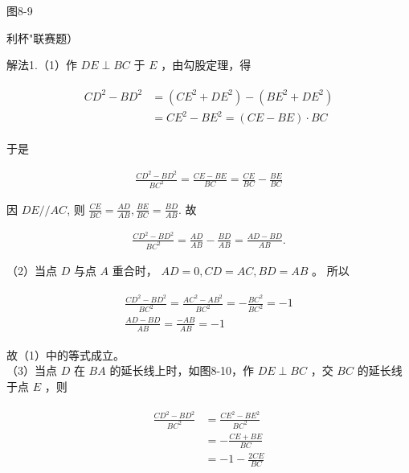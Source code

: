 \documentclass[10pt]{article}
\begin{document}
图8-9

利杯"联赛题）

解法1.（1）作 $D E \perp B C$ 于 $E$ ，由勾股定理，得

\begin{align*}
\begin{aligned}
C D^{2}-B D^{2} & =\left(C E^{2}+D E^{2}\right)-\left(B E^{2}+D E^{2}\right) \\
& =C E^{2}-B E^{2}=(C E-B E) \cdot B C
\end{aligned}
\end{align*}

于是

\begin{align*}
\frac{C D^{2}-B D^{2}}{B C^{2}}=\frac{C E-B E}{B C}=\frac{C E}{B C}-\frac{B E}{B C}
\end{align*}

因 $D E / / A C$, 则 $\frac{C E}{B C}=\frac{A D}{A B}, \frac{B E}{B C}=\frac{B D}{A B}$. 故

\begin{align*}
\frac{C D^{2}-B D^{2}}{B C^{2}}=\frac{A D}{A B}-\frac{B D}{A B}=\frac{A D-B D}{A B} .
\end{align*}

（2）当点 $D$ 与点 $A$ 重合时， $A D=0, C D=A C, B D=A B$ 。 所以

\begin{align*}
\begin{gathered}
\frac{C D^{2}-B D^{2}}{B C^{2}}=\frac{A C^{2}-A B^{2}}{B C^{2}}=-\frac{B C^{2}}{B C^{2}}=-1 \\
\frac{A D-B D}{A B}=\frac{-A B}{A B}=-1
\end{gathered}
\end{align*}

故（1）中的等式成立。\\
（3）当点 $D$ 在 $B A$ 的延长线上时，如图8-10，作 $D E \perp B C$ ，交 $B C$ 的延长线于点 $E$ ，则

\begin{align*}
\begin{aligned}
\frac{C D^{2}-B D^{2}}{B C^{2}} & =\frac{C E^{2}-B E^{2}}{B C^{2}} \\
& =-\frac{C E+B E}{B C} \\
& =-1-\frac{2 C E}{B C}
\end{aligned}
\end{align*}
\end{document}
